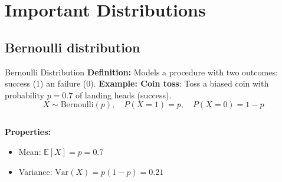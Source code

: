 \documentclass{beamer}
\begin{document}
\section{Important Distributions}

\subsection{Bernoulli distribution}

\begin{frame}{Bernoulli Distribution}
  \textbf{Definition:} Models a procedure with two outcomes: success (1) an failure (0).
  \textbf{Example: Coin toss}: Toss a biased coin with probability \(p=0.7\) of landing heads (success).
  \vspace{0.5em}
  \[
    X \sim \text{Bernoulli}(p), \quad P(X=1) = p, \quad P(X=0) = 1-p
  \]

  \begin{columns}[T] %
    \begin{column}{0.48\textwidth}
      \textbf{Properties:}
      \begin{itemize}
        \item Mean: \( \mathbb{E}[X] = p = 0.7 \)
        \item Variance: \( \mathrm{Var}(X) = p(1-p) = 0.21 \)
      \end{itemize}
    \end{column}

    \begin{column}{0.48\textwidth}
    \end{column}
  \end{columns}
\end{frame}
\end{document}
